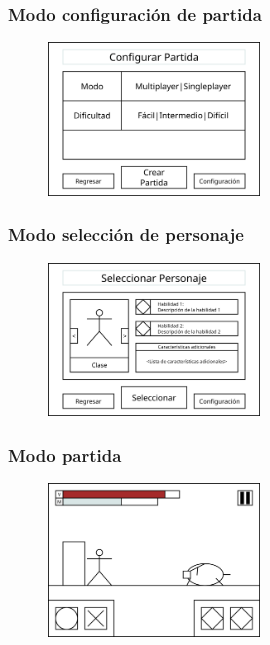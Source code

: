 \subsubsection{Modo configuración de partida}
\begin{figure}[H]
    \centering
    \includegraphics[width=0.5\textwidth]{5-Cuerpo/Chapter5/I10.png} %
    \caption{}
    \label{fig:I10}
\end{figure}

\subsubsection{Modo selección de personaje}
\begin{figure}[H]
    \centering
    \includegraphics[width=0.5\textwidth]{5-Cuerpo/Chapter5/I5.png} %
    \caption{}
    \label{fig:I5}
\end{figure}

\subsubsection{Modo partida}
\begin{figure}[H]
    \centering
    \includegraphics[width=0.5\textwidth]{5-Cuerpo/Chapter5/I6.png} %
    \caption{}
    \label{fig:I6}
\end{figure}

